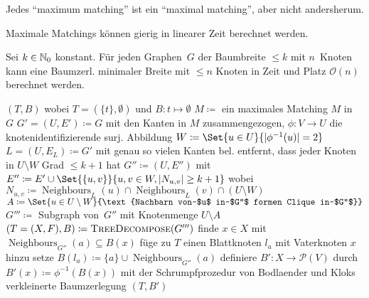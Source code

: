 \documentclass{cheat-sheet}
\newcommand{\size}[1]{\abs{#1}} %
\newcommand{\Powerset}{\mathcal{P}} %
\renewcommand{\O}{\mathcal{O}} %
\DeclareMathOperator{\Neighbours}{Neighbours} %
\newcommand{\IndentState}[1]{\State \quad #1}
\begin{document}
\begin{acht}
  Jedes ``maximum matching'' ist ein ``maximal matching'', aber nicht andersherum.
\end{acht}

\begin{bem}
  Maximale Matchings können gierig in linearer Zeit berechnet werden.
\end{bem}

\begin{satz}
  Sei $k \in \mathbb{N}_0$ konstant.
  Für jeden Graphen~$G$ der Baumbreite $\leq k$ mit $n$~Knoten kann eine Baumzerl. minimaler Breite mit $\leq n$ Knoten in Zeit und Platz $\O(n)$ berechnet werden.
\end{satz}

\begin{algorithmic}
     \Return $(T, B)$ wobei $T = (\{ t \}, \emptyset)$ und $B : t \mapsto \emptyset$ \EndIf
    \State $M \coloneqq $ ein maximales Matching $M$ in~$G$
    \State $G' = (U, E') \coloneqq G$ mit den Kanten in $M$ zusammengezogen,
    \IndentState $\phi : V \to U$ die knotenidentifizierende surj. Abbildung
    \State $W \coloneqq \Set{u \in U}{\size{\phi^{-1}(u)} = 2}$
    \State $L = (U, E_L) \coloneqq G'$ mit genau so vielen Kanten bel. entfernt,
    \IndentState dass jeder Knoten in $U \setminus W$ Grad $\leq k + 1$ hat
    \State $G'' \coloneqq (U, E'')$ mit $E'' \coloneqq E' \cup \Set{\{ u, v \}}{u, v \in W, \size{N_{u,v}} \geq k+1}$
    \IndentState wobei $N_{u,v} \coloneqq \Neighbours_L(u) \cap \Neighbours_L(v) \cap (U \setminus W)$
    \State $A \coloneqq \Set{u \in U \setminus W}{\text{Nachbarn von~$u$ in~$G''$ formen Clique in~$G''$}}$
    \State $G''' \coloneqq$ Subgraph von~$G''$ mit Knotenmenge $U \setminus A$
    \State $(T = (X, F), B) \coloneqq \Call{TreeDecompose}{G'''}$
      \State finde $x \in X$ mit $\Neighbours_{G''}(a) \subseteq B(x)$
      \State füge zu $T$ einen Blattknoten $l_a$ mit Vaterknoten $x$ hinzu
      \State setze $B(l_a) \coloneqq \{ a \} \cup \Neighbours_{G''}(a)$
    \EndFor
    \State definiere $B' : X \to \Powerset(V)$ durch $B'(x) \coloneqq \phi^{-1}(B(x))$
    \State \Return mit der Schrumpfprozedur von Bodlaender und Kloks
    \IndentState verkleinerte Baumzerlegung $(T, B')$
  \EndFunction
\end{algorithmic}
\end{document}
